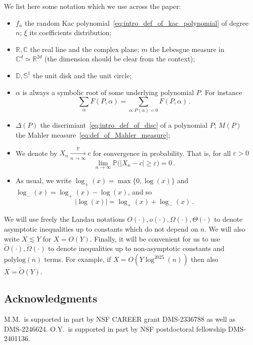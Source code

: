 \documentclass[11pt]{amsart}
\theoremstyle{remark}
\theoremstyle{definition}
\def\eps{{\varepsilon}}
\newcommand{\bR}{\mathbb R}
\newcommand{\bC}{\mathbb C}
\newcommand{\bD}{\mathbb D}
\newcommand{\bP}{\mathbb P}
\newcommand{\bS}{\mathbb S}
\newcommand{\polylog}{\mathrm{polylog}}
\newcommand{\disc}{\Delta}
\begin{document}
    We list here some notation which we use across the paper:
    \begin{itemize}
        \item $f_n$ the random Kac polynomial~\eqref{eq:intro_def_of_kac_polynomial} of degree $n$; $\xi$ its coefficients distribution; \vspace{4pt}
        \item $\bR,\bC$ the real line and the complex plane; $m$ the Lebesgue measure in $\bC^d\simeq \bR^{2d}$ (the dimension should be clear from the context); \vspace{4pt}
        \item $\bD,\bS^1$ the unit disk and the unit circle; \vspace{4pt}
        \item $\alpha$ is always a symbolic root of some underlying polynomial $P$. For instance
        \[
        \sum_{\alpha} F(P,\alpha) = \sum_{\alpha: P(\alpha)=0} F(P,\alpha) \, .
        \]
        \item $\disc(P)$ the discrimiant~\eqref{eq:intro_def_of_disc} of a polynomial $P$; $M(P)$ the Mahler measure~\eqref{eq:def_of_Mahler_measure};    \vspace{4pt}
        \item We denote by $X_n\xrightarrow[n\to\infty]{\bP}c$ for convergence in probability. That is, for all $\eps>0$
        \[
        \lim_{n\to\infty} \bP\big(|X_n-c|\ge \eps\big) = 0\, .
        \]
        \item As usual, we write $\log_+(x) = \max\{0,\log(x)\}$ and $\log_-(x) = \log_+(x)-\log(x)$, and so
        \[
        |\log(x)| = \log_+(x) + \log_-(x) \, .
        \]         
        \end{itemize}
        We will use freely the Landau notations $O(\cdot),o(\cdot),\Omega(\cdot),\Theta(\cdot)$ to denote asymptotic inequalities up to constants which do not depend on $n$. We will also write $X\lesssim Y$ for $X=O(Y)$. Finally, it will be convenient for us to use $\widetilde O(\cdot), \widetilde \Omega(\cdot)$ to denote inequalities up to non-asymptotic constants and $\polylog(n)$ terms. For example, if $X = O(Y \log^{2025}(n))$ then also $X=\widetilde{O}(Y)$.
    
    \subsection*{Acknowledgments}
    M.M.\ is supported in part by NSF CAREER grant DMS-2336788 as well as DMS-2246624. O.Y.\ is supported in part by NSF postdoctoral fellowship DMS-2401136.
\end{document}
